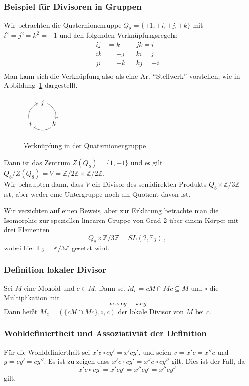 \documentclass[12pt, german]{article}
\newcommand{\Z}{\mathbb{Z}}
\begin{document}
	\subsubsection{Beispiel für Divisoren in Gruppen}
	Wir betrachten die Quaternionenruppe $Q_8 =  \{\pm1, \pm i ,\pm j, \pm k\}$ mit $i^2 = j^2 = k^2 = -1$ und den folgenden Verknüpfungsregeln:
	\begin{align*}
		ij &= k && jk = i  \\ 
		ik&=-j 	&& ki = j \\
		ji&= -k && kj = -i \\
	\end{align*}
	Man kann sich die Verknüpfung also als eine Art ``Stellwerk'' vorstellen, wie in Abbildung~\ref{fig:quaternion} dargestellt.
	\begin{figure}[h!]
		\centering
		$ \begin{array}{ccc}
			\begin{tikzpicture}[->,scale=.7] 
				\foreach \a/\t in {90/j,-30/k,210/i}{
					\node (\t) at (\a:1cm) {$\t$};
					\draw (\a-20:1cm)  arc (\a-20:\a-100:1cm);
				} 
			\end{tikzpicture}
		\end{array}$
		\caption{Verknüpfung in der Quaternionengruppe}
		\label{fig:quaternion}
	\end{figure}
	
	Dann ist das Zentrum $Z(Q_8) = \{1, -1\}$ und es gilt $Q_8/Z(Q_8) = V = \Z/2\Z \times\Z/2\Z$.\\
	Wir behaupten dann, dass $V$ ein Divisor des semidirekten Produkts $Q_8  \rtimes \Z / 3\Z$ ist, aber weder eine Untergruppe noch ein Quotient davon ist.
	
	Wir verzichten auf einen Beweis, aber zur Erklärung betrachte man die Isomorphie zur speziellen linearen Gruppe von Grad 2 über einem Körper mit drei Elementen $$Q_8  \rtimes \Z / 3\Z = SL(2, \mathbb{F}_3)\, ,$$ 
	wobei hier $\mathbb{F}_3 = \Z / 3\Z$ gesetzt wird.
	
	\subsubsection{Definition lokaler Divisor}
	Sei $M$ eine Monoid und $c \in M$. Dann sei $M_c = cM \cap Mc \subseteq M$ und $\circ$ die Multiplikation mit $$xc \circ cy = xcy$$
	Dann heißt $M_c = (\{cM \cap Mc\}, \circ, c)$ der lokale Divisor von $M$ bei $c$.
	
	\subsubsection{Wohldefiniertheit und Assoziativiät der Definition}
	Für die Wohldefiniertheit sei $x'c \circ cy' = x'cy'$, und seien $x = x'c = x''c$ und $y = cy' = cy''$. Es ist zu zeigen dass $x'c \circ cy' = x''c \circ cy''$ gilt. Dies ist der Fall, da $$x'c \circ cy' = x'cy' = x''cy' = x''cy''$$ gilt. 
	
\end{document}
